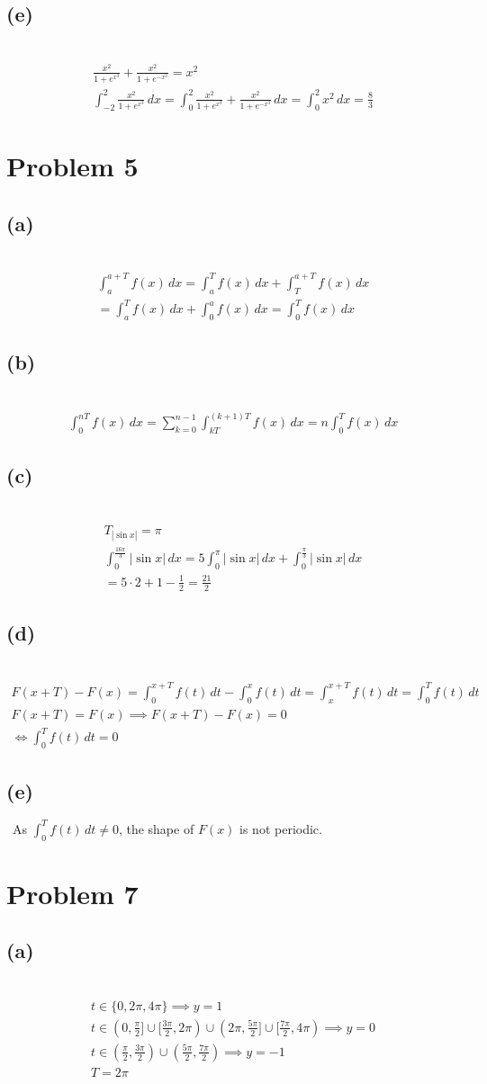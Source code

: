 \documentclass[12pt]{article}
\newcommand{\problem}[1]{\section{Problem #1}}
\newcommand{\subproblem}[1]{\subsection{(#1)} \,}
\begin{document}
\subproblem{e}
\begin{gather*}
    \frac{x^2}{1+e^{x^3}}+\frac{x^2}{1+e^{-x^3}} = x^2\\
    \int_{-2}^2 \frac{x^2}{1+e^{x^3}}\, dx = \int_0^2 \frac{x^2}{1+e^{x^3}}+\frac{x^2}{1+e^{-x^3}} \, dx = \int_0^2 x^2\,dx = \boxed{\frac{8}{3}}
\end{gather*}

\problem{5}

\subproblem{a}
\begin{gather*}
    \int_a^{a+T} f(x)\, dx= \int_a^T f(x)\, dx+\int_T^{a+T} f(x)\, dx\\
    = \int_a^T f(x)\, dx+\int_0^{a} f(x)\, dx = \int_0^T f(x)\, dx
\end{gather*}

\subproblem{b}
\begin{gather*}
    \int_0^{nT}f(x)\, dx = \sum_{k=0}^{n-1} \int_{kT}^{(k+1)T} f(x)\, dx = n\int_0^T f(x)\,dx
\end{gather*}

\subproblem{c}
\begin{gather*}
    T_{|\sin x|} = \pi \\
    \int_0^\frac{16\pi}{3} |\sin x|\, dx =  5\int_0^\pi |\sin x| \, dx + \int_0^\frac{\pi}{3}|\sin x |\, dx\\
    =5\cdot 2+1-\frac{1}{2}=\boxed{\frac{21}{2}}
\end{gather*}

\subproblem{d}
\begin{gather*}
    F(x+T)-F(x)=\int_0^{x+T} f(t)\, dt - \int_0^x f(t)\, dt=\int_x^{x+T} f(t)\, dt = \int_0^T f(t)\, dt\\
    F(x+T) = F(x) \implies F(x+T)-F(x)=0\\
    \iff  \int_0^T f(t)\, dt =0
\end{gather*}

\subproblem{e}
As $\int_0^T f(t)\, dt \ne 0$, the shape of $F(x)$ is not periodic.

\problem{7}

\subproblem{a}
\begin{gather*}
    t\in \{0,2\pi,4\pi\} \implies y=1\\
    t\in (0, \frac{\pi}{2}] \cup  [\frac{3\pi}{2}, 2\pi )\cup (2\pi ,  \frac{5\pi}{2}] \cup [\frac{7\pi}{2},4\pi) \implies y=0\\
    t\in (\frac{\pi}{2}, \frac{3\pi}{2}) \cup (\frac{5\pi}{2},\frac{7\pi}{2})\implies y=-1\\
    T=2\pi 
\end{gather*}
\end{document}
